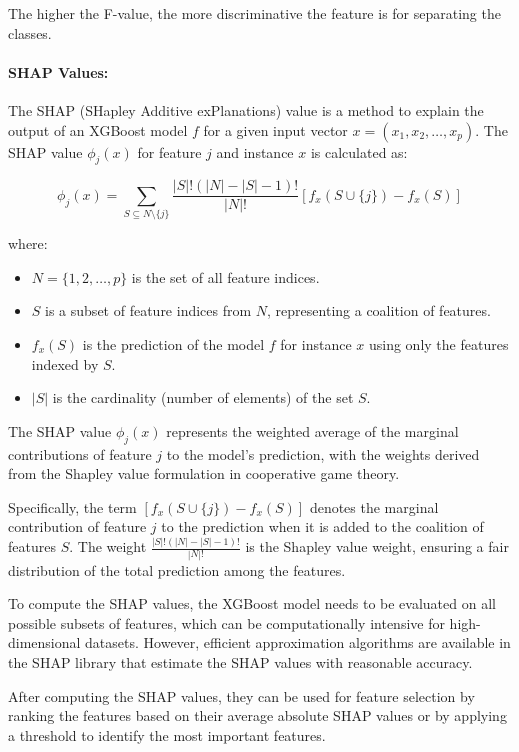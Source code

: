 \documentclass{article}
\theoremstyle{plain}
\theoremstyle{definition}
\theoremstyle{remark}
\begin{document}
The higher the F-value, the more discriminative the feature is for separating the classes. 

\paragraph{SHAP Values:} The SHAP (SHapley Additive exPlanations) value is a method to explain the output of an XGBoost model \( f \) for a given input vector \( x = (x_1, x_2, \ldots, x_p) \). The SHAP value \( \phi_j(x) \) for feature \( j \) and instance \( x \) is calculated as:

$$\phi_j(x) = \sum_{S \subseteq N \setminus \{j\}} \frac{|S|!(|N|-|S|-1)!}{|N|!}[f_{x}(S \cup \{j\}) - f_{x}(S)]$$

where:

\begin{itemize}
    \item \( N = \{1, 2, \ldots, p\} \) is the set of all feature indices.
    \item \( S \) is a subset of feature indices from \( N \), representing a coalition of features.
    \item \( f_{x}(S) \) is the prediction of the model \( f \) for instance \( x \) using only the features indexed by \( S \).
    \item \( |S| \) is the cardinality (number of elements) of the set \( S \).
\end{itemize}

The SHAP value \( \phi_j(x) \) represents the weighted average of the marginal contributions of feature \( j \) to the model's prediction, with the weights derived from the Shapley value formulation in cooperative game theory.

Specifically, the term \( [f_{x}(S \cup \{j\}) - f_{x}(S)] \) denotes the marginal contribution of feature \( j \) to the prediction when it is added to the coalition of features \( S \). The weight \( \frac{|S|!(|N|-|S|-1)!}{|N|!} \) is the Shapley value weight, ensuring a fair distribution of the total prediction among the features.

To compute the SHAP values, the XGBoost model needs to be evaluated on all possible subsets of features, which can be computationally intensive for high-dimensional datasets. However, efficient approximation algorithms are available in the SHAP library that estimate the SHAP values with reasonable accuracy.

After computing the SHAP values, they can be used for feature selection by ranking the features based on their average absolute SHAP values or by applying a threshold to identify the most important features.
\end{document}
